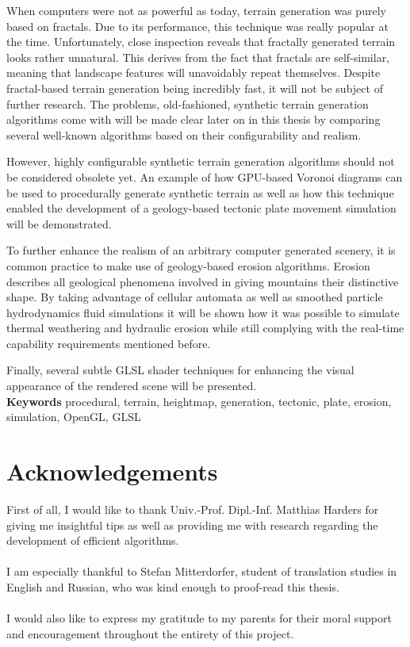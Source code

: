 \documentclass[11pt,a4paper,twoside,openright]{report}
\begin{document}
When computers were not as powerful as today, terrain generation was purely based on fractals. Due to its performance, this technique was really popular at the time. Unfortunately, close inspection reveals that fractally generated terrain looks rather unnatural. This derives from the fact that fractals are self-similar, meaning that landscape features will unavoidably repeat themselves. Despite fractal-based terrain generation being incredibly fast, it will not be subject of further research. The problems, old-fashioned, synthetic terrain generation algorithms come with will be made clear later on in this thesis by comparing several well-known algorithms based on their configurability and realism.

However, highly configurable synthetic terrain generation algorithms should not be considered obsolete yet. An example of how GPU-based Voronoi diagrams can be used to procedurally generate synthetic terrain as well as how this technique enabled the development of a geology-based tectonic plate movement simulation will be demonstrated.

To further enhance the realism of an arbitrary computer generated scenery, it is common practice to make use of geology-based erosion algorithms. Erosion describes all geological phenomena involved in giving mountains their distinctive shape. By taking advantage of cellular automata as well as smoothed particle hydrodynamics fluid simulations it will be shown how it was possible to simulate thermal weathering and hydraulic erosion while still complying with the real-time capability requirements mentioned before.

Finally, several subtle GLSL shader techniques for enhancing the visual appearance of the rendered scene will be presented.
\medskip
\noindent \\\textbf{Keywords} procedural, terrain, heightmap, generation, tectonic, plate, erosion, simulation, OpenGL, GLSL

\chapter*{Acknowledgements}
First of all, I would like to thank Univ.-Prof. Dipl.-Inf. Matthias Harders for giving me insightful tips as well as providing me with research regarding the development of efficient algorithms.
\\
\\
I am especially thankful to Stefan Mitterdorfer, student of translation studies in English and Russian, who was kind enough to proof-read this thesis.
\\
\\
I would also like to express my gratitude to my parents for their moral support and encouragement throughout the entirety of this project.
\end{document}
